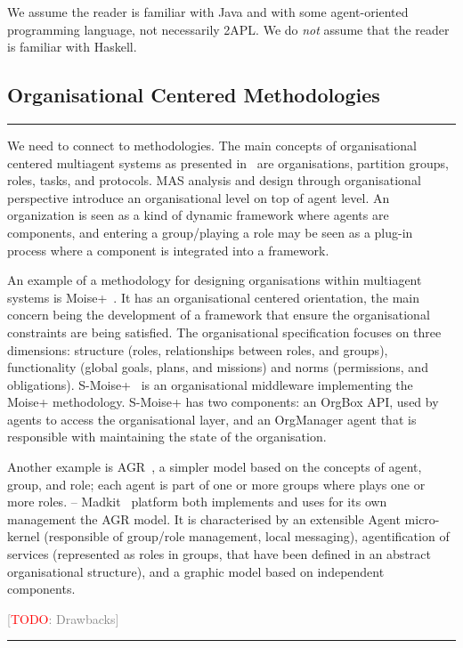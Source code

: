 \documentclass[conference,compsoc]{IEEEtran}
\newcommand{\todo}[1]{{\small \textcolor{gray}{[\textcolor{red}{TODO}: #1]}}}
\newenvironment{notes}{\medskip\hrule\nobreak\smallskip\narrower}{\smallskip\hrule\medskip}
\begin{document}
We assume the reader is familiar with Java and with some agent-oriented
programming language, not necessarily 2APL. We do \emph{not} assume that
the reader is familiar with Haskell.

\subsection{Organisational Centered Methodologies}

\begin{notes}
We need to connect to methodologies.
The main concepts of organisational centered multiagent systems as
presented in~\cite{DBLP:conf/aose/FerberGM03} are organisations, partition
groups, roles, tasks, and protocols. MAS analysis and design through
organisational perspective introduce an organisational level on top of
agent level. An organization is seen as a kind of dynamic framework where
agents are components, and entering a group/playing a role may be seen as a
plug-in process where a component is integrated into a framework.


An example of a methodology for designing organisations within multiagent
systems is Moise+~\cite{DBLP:conf/atal/HubnerSB05}. It has an
organisational centered orientation, the main concern being the development
of a framework that ensure the organisational constraints are being
satisfied. The organisational specification focuses on three dimensions:
structure (roles, relationships between roles, and groups), functionality
(global goals, plans, and missions) and norms (permissions, and
obligations). S-Moise+~\cite{DBLP:conf/atal/HubnerSB05} is an
organisational middleware implementing the Moise+ methodology. S-Moise+ has
two components: an OrgBox API, used by agents to access the organisational
layer, and an OrgManager agent that is responsible with maintaining the
state of the organisation.

Another example is AGR~\cite{DBLP:conf/aose/FerberGM03}, a simpler model
based on the concepts of agent, group, and role; each agent is part of one
or more groups where plays one or more roles. -- Madkit~\cite{} platform both implements and uses for its own management the AGR model. It is characterised by an extensible Agent micro-kernel (responsible of group/role management, local messaging), agentification of services (represented as roles in groups, that have been defined in an abstract organisational structure), and a graphic model based on independent components.


\todo{Drawbacks}

\end{notes}
\end{document}
